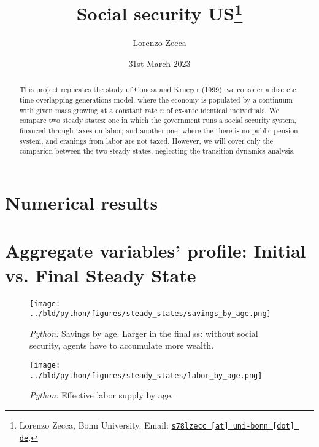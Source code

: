 \documentclass[11pt, a4paper, leqno]{article}
\begin{document}
\title{Social security US\thanks{Lorenzo Zecca, Bonn University. Email: \href{mailto:s78lzecc@uni-bonn.de}{\nolinkurl{s78lzecc [at] uni-bonn [dot] de}}.}}

\author{Lorenzo Zecca}

\date{
    31st March 2023
}

\maketitle


\begin{abstract}
    This project replicates the study of Conesa and Krueger (1999): we consider a discrete time overlapping generations model, 
    where the economy is populated by a continuum with given mass 
    growing at a constant rate $n$ of ex-ante identical individuals.
    We compare two steady states: 
    one in which the government runs a social security system, financed 
    through taxes on labor; and another one, where the there is no public 
    pension system, and eranings from labor are not taxed. However, we will cover only 
    the comparion between the two steady states, neglecting the transition dynamics analysis.
\end{abstract}

\clearpage


\section{Numerical results} %
\begin{table}

\end{table}
\section{Aggregate variables' profile: Initial vs. Final Steady State}

\begin{figure}[h]

    \centering
    \texttt{[image: ../bld/python/figures/steady\_states/savings\_by\_age.png]}
    \caption{\emph{Python:} Savings by age. Larger in the final ss: without social security, agents have to accumulate more wealth.}
    \label{fig:python-K}
\end{figure}

\begin{figure}
    
    \centering
    \texttt{[image: ../bld/python/figures/steady\_states/labor\_by\_age.png]}
    \caption{\emph{Python:} Effective labor supply by age.}
    \label{fig:python-L}

\end{figure}
\end{document}

